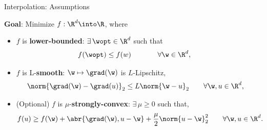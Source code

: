 \documentclass[mathserif,notheorems, hyperref={colorlinks, citecolor=blue, urlcolor=blue, linkcolor=blue}]{beamer}
\begin{document}
    \begin{frame}{Interpolation: Assumptions}
        \begin{center}
            \Large 
            \textbf{Goal}: Minimize \( f : \R^d \into \R\), where 
        \end{center}
       
        \vspace{3ex}
        
        \begin{itemize}
            \item \( f \) is \textbf{lower-bounded}: \( \exists \, \wopt \in \R^d \) such that
                \begin{align*}
                    f(\wopt) &\leq f(w) \hspace{1.7em} \tag*{\(\forall \w \in \R^d \), } 
                \end{align*}

            \item \( f \) is L-\textbf{smooth}: \( \w \mapsto \grad(\w) \) is \( L \)-Lipschitz, 
                \begin{align*}
                    \norm{\grad(\w) - \grad(u)}_2 &\leq L \norm{\w - u}_2 \tag*{\(\forall \w, u \in \R^d \),} 
                \end{align*}

            \item (Optional) \( f \) is \( \mu \)-\textbf{strongly-convex}: \( \exists \, \mu \geq 0 \) such that, 
                \begin{align*}
                   f(u) \geq f(\w) + \abr{\grad(\w), u - \w} + \frac{\mu}{2} \norm{u - \w}^2_2 \tag*{\( \forall \w, u \in \R^d \).}
                \end{align*}
        \end{itemize}
     
    \end{frame}
\end{document}
